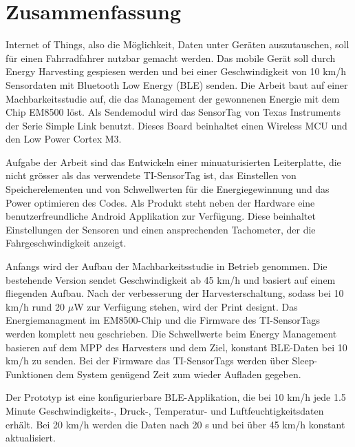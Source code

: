 \chapter*{Zusammenfassung}

Internet of Things, also die Möglichkeit, Daten unter Geräten auszutauschen, soll für einen Fahrradfahrer nutzbar gemacht werden. Das  mobile Gerät soll durch Energy Harvesting gespiesen werden und bei einer Geschwindigkeit von 10 km/h Sensordaten mit Bluetooth Low Energy (BLE) senden. Die Arbeit baut auf einer Machbarkeitsstudie auf, die das Management der gewonnenen Energie mit dem Chip EM8500 löst. Als Sendemodul wird das SensorTag von Texas Instruments der Serie Simple Link benutzt. Dieses Board beinhaltet einen Wireless MCU und den Low Power Cortex M3. 

Aufgabe der Arbeit sind das Entwickeln einer minuaturisierten Leiterplatte, die nicht grösser als das verwendete TI-SensorTag ist, das Einstellen von Speicherelementen und von Schwellwerten für die Energiegewinnung und das Power optimieren des Codes. Als Produkt steht neben der Hardware eine benutzerfreundliche Android Applikation zur Verfügung. Diese beinhaltet Einstellungen der Sensoren und einen ansprechenden Tachometer, der die Fahrgeschwindigkeit anzeigt. 

Anfangs wird der Aufbau der Machbarkeitsstudie in Betrieb genommen. Die bestehende Version sendet Geschwindigkeit ab 45 km/h und basiert auf einem fliegenden Aufbau.
Nach der verbesserung der Harvesterschaltung, sodass bei 10 km/h rund 20 $\mu$W zur Verfügung stehen, wird der Print designt. Das Energiemanagment im EM8500-Chip und die Firmware des TI-SensorTags werden komplett neu geschrieben. Die Schwellwerte beim Energy Management basieren auf dem MPP des Harvesters und dem Ziel, konstant BLE-Daten bei 10 km/h zu senden. Bei der Firmware das TI-SensorTags werden über Sleep-Funktionen dem System genügend Zeit zum wieder Aufladen gegeben. 

Der Prototyp ist eine konfigurierbare BLE-Applikation, die bei 10 km/h jede 1.5 Minute Geschwindigkeits-, Druck-, Temperatur- und Luftfeuchtigkeitsdaten erhält. Bei 20 km/h werden die Daten nach 20 s und bei über 45 km/h konstant aktualisiert.
